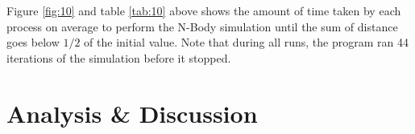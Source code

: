 \documentclass{article}
\begin{document}
Figure \ref{fig:10} and table \ref{tab:10} above shows the amount of time taken by each process on
average to perform the N-Body simulation until the sum of distance goes below \(1/2\) of the initial
value. Note that during all runs, the program ran 44 iterations of the simulation before it stopped.

\section*{Analysis \& Discussion}
\end{document}
